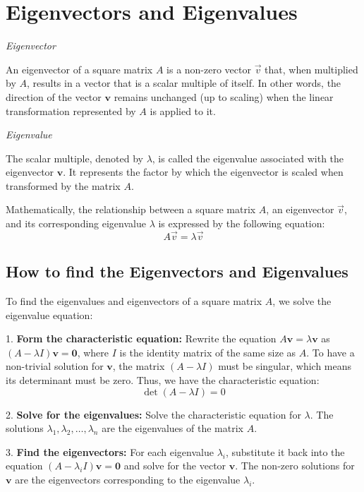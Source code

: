 \newpage
\section{Eigenvectors and Eigenvalues}

\emph{Eigenvector}

An eigenvector of a square matrix \(A\) is a non-zero vector \(\vec{v}\) that, when multiplied by \(A\), results in a vector that is a scalar multiple of itself. In other words, the direction of the vector \(\mathbf{v}\) remains unchanged (up to scaling) when the linear transformation represented by \(A\) is applied to it.

\emph{Eigenvalue}

The scalar multiple, denoted by \(\lambda\), is called the eigenvalue associated with the eigenvector \(\mathbf{v}\). It represents the factor by which the eigenvector is scaled when transformed by the matrix \(A\).

Mathematically, the relationship between a square matrix \(A\), an eigenvector \(\vec{v}\), and its corresponding eigenvalue \(\lambda\) is expressed by the following equation:
\[
A\vec{v} = \lambda\vec{v}
\]

\subsection{How to find the Eigenvectors and Eigenvalues}

To find the eigenvalues and eigenvectors of a square matrix \(A\), we solve the eigenvalue equation:

 1.\textbf{ Form the characteristic equation:}
    Rewrite the equation \(A\mathbf{v} = \lambda\mathbf{v}\) as \((A - \lambda I)\mathbf{v} = \mathbf{0}\), where \(I\) is the identity matrix of the same size as \(A\). To have a non-trivial solution for \(\mathbf{v}\), the matrix \((A - \lambda I)\) must be singular, which means its determinant must be zero. Thus, we have the characteristic equation:
    \[
    \det(A - \lambda I) = 0
    \]

 2.\textbf{ Solve for the eigenvalues:}
    Solve the characteristic equation for \(\lambda\). The solutions \(\lambda_1, \lambda_2, \dots, \lambda_n\) are the eigenvalues of the matrix \(A\).

 3.\textbf{ Find the eigenvectors:}
    For each eigenvalue \(\lambda_i\), substitute it back into the equation \((A - \lambda_i I)\mathbf{v} = \mathbf{0}\) and solve for the vector \(\mathbf{v}\). The non-zero solutions for \(\mathbf{v}\) are the eigenvectors corresponding to the eigenvalue \(\lambda_i\).

